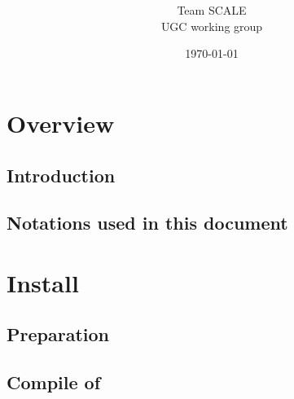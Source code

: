 \documentclass[a4paper]{report}
\title{{\vspace{2cm}{\Large Version \version} }}
\author{\Large Team SCALE\\ UGC working group}
\date{\today}
\begin{document}
\maketitle
\ClearWallPaper
{}
\tableofcontents


\part{Overview} \label{part:overview}
 \chapter{Introduction} \label{sec:introduction}
 \chapter{Notations used in this document} \label{sec:notation}

\part{Install} \label{part:install}
 \chapter{Preparation}
 \chapter{Compile of \scalelib}
\end{document}
